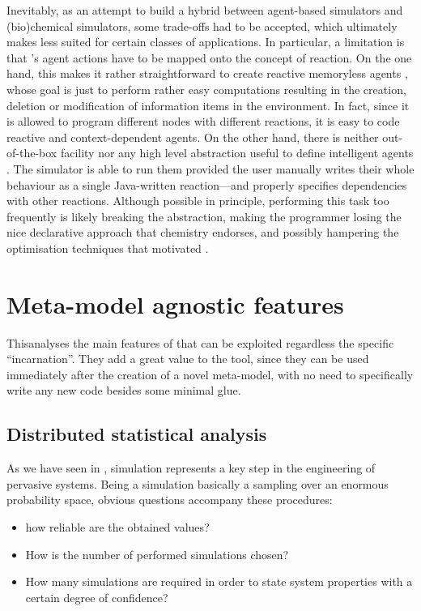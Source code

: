 \documentclass[12pt,a4paper,twoside,openright]{book}
\begin{document}
Inevitably, as an attempt to build a hybrid between agent-based simulators and (bio)chemical simulators, some trade-offs had to be accepted, which ultimately makes \alchemist{} less suited for certain classes of applications.
%
In particular, a limitation is that \alchemist{}'s agent actions have to be mapped onto the concept of reaction. 
%
On the one hand, this makes it rather straightforward to create reactive memoryless agents \cite{BandiniJASSS2009}, whose goal is just to perform rather easy computations resulting in the creation, deletion or modification of information items in the environment.
%
In fact, since it is allowed to program different nodes with different reactions, it is easy to code reactive and context-dependent agents. On the other hand, there is neither out-of-the-box facility nor any high level abstraction useful to define intelligent agents \cite{BandiniJASSS2009}. The simulator is able to run them provided the user manually writes their whole behaviour as a single Java-written reaction---and properly specifies dependencies with other reactions.
%
Although possible in principle, performing this task too frequently is likely breaking the \alchemist{} abstraction, making the programmer losing the nice declarative approach that chemistry endorses, and possibly hampering the optimisation techniques that motivated \alchemist{}.

\chapter{Meta-model agnostic features}

This\levelText{}analyses the main features of \alchemist{} that can be exploited regardless the specific ``incarnation''.
%
They add a great value to the tool, since they can be used immediately after the creation of a novel meta-model, with no need to specifically write any new code besides some minimal glue.

\section{Distributed statistical analysis}

As we have seen in , simulation represents a key step in the engineering of pervasive systems.
%
Being a simulation basically a sampling over an enormous probability space, obvious questions accompany these procedures:
\begin{itemize}
 \item how reliable are the obtained values?
 \item How is the number of performed simulations chosen?
 \item How many simulations are required in order to state system properties with a certain degree of confidence?
\end{itemize}
\end{document}

